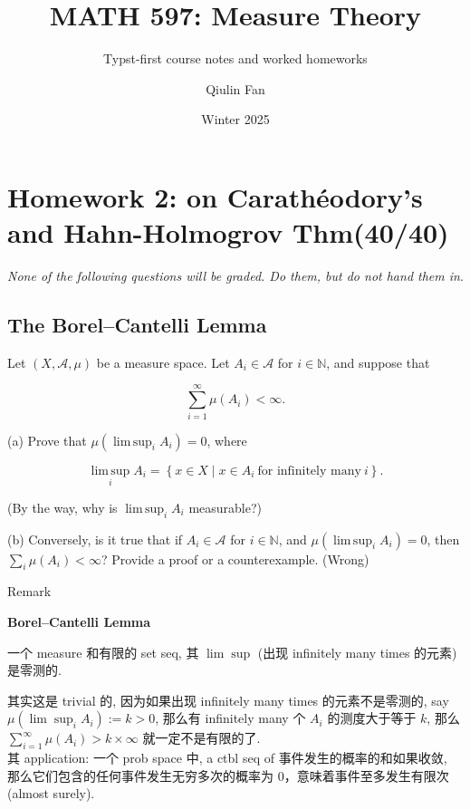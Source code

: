 \documentclass{qlnotes-export}
\title{MATH 597: Measure Theory}
\subtitle{Typst-first course notes and worked homeworks}
\author{Qiulin Fan}
\date{Winter 2025}
\begin{document}
\mainmatter
\chapter{Homework 2: on Carathéodory's and Hahn-Holmogrov Thm(40/40)}\label{homework-2-on-carathuxe9odorys-and-hahn-holmogrov-thm4040}

\emph{None of the following questions will be graded. Do them, but do not hand them in}.

\section{The Borel--Cantelli Lemma}\label{the-borelcantelli-lemma}

Let \((X,\mathcal{A},\mu)\) be a measure space. Let \(A_{i} \in \mathcal{A}\) for \(i \in {\mathbb{N}}\), and suppose that

\[\sum\limits_{i = 1}^{\infty}\mu(A_{i}) < \infty.\]

(a) Prove that \(\mu(\operatorname{lim\, sup}_{i}A_{i}) = 0\), where

\[\operatorname{lim\, sup}\limits_{i}A_{i} = \left\{ {x \in X \mid x \in A_{i}\ \text{for infinitely many}\ i} \right\}.\]

(By the way, why is \(\operatorname{lim\, sup}_{i}A_{i}\) measurable?)

(b) Conversely, is it true that if \(A_{i} \in \mathcal{A}\) for \(i \in {\mathbb{N}}\), and \(\mu(\operatorname{lim\, sup}_{i}A_{i}) = 0\), then \(\sum_{i}\mu(A_{i}) < \infty\)? Provide a proof or a counterexample. (Wrong)

\begin{qlremark}{Remark}

\begin{theorem}{\protect{}\label{kn-borel-cantelli-lemma}{\textbf{Borel--Cantelli
Lemma}}}

一个 measure 和有限的 set seq, 其 \(\lim\sup\) (出现 infinitely many times 的元素) 是零测的.

\end{theorem}

其实这是 trivial 的, 因为如果出现 infinitely many times 的元素不是零测的, say \(\mu(\lim\sup_{i}A_{i}) := k > 0\), 那么有 infinitely many 个 \(A_{i}\) 的测度大于等于 \(k\), 那么 \(\sum_{i = 1}^{\infty}\mu(A_{i}) > k \times \infty\) 就一定不是有限的了.\\
其 application: 一个 prob space 中, a ctbl seq of 事件发生的概率的和如果收敛, 那么它们包含的任何事件发生无穷多次的概率为 0，意味着事件至多发生有限次 (almost surely).

\end{qlremark}
\end{document}
